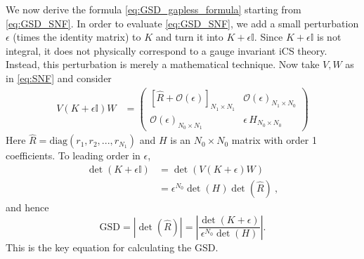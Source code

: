 \documentclass[aps,prb,twocolumn,superscriptaddress,floatfix,10pt,nofootinbib]{revtex4-2}
\theoremstyle{definition}
\begin{document}
We now derive the formula \eqref{eq:GSD_gapless_formula} starting from \eqref{eq:GSD_SNF}. In order to evaluate \eqref{eq:GSD_SNF}, we add a small perturbation $\epsilon$ (times the identity matrix) to $K$ and turn it into $K+\epsilon\mathbb{I}$. Since $K+\epsilon\mathbb{I}$ is not integral, it does not physically correspond to a gauge invariant iCS theory. Instead, this perturbation is merely a mathematical technique. Now take $V,W$ as in \eqref{eq:SNF} and consider
\begin{align}
    V(K+\epsilon\mathbb{I})W&=
\begin{pmatrix}
    \left[\hat R+\mathcal{O}(\epsilon)\right]_{N_1\times N_1} & \mathcal{O}(\epsilon)_{N_1\times N_0}\\
    \mathcal{O}(\epsilon)_{N_0\times N_1} & \epsilon\, H_{N_0\times N_0}
\end{pmatrix} \label{eq:CS_gapless_block} \nonumber
\end{align}
Here $\hat R=\text{diag}(r_1,r_2,...,r_{N_1})$ and $H$ is an $N_0\times N_0$ matrix with order 1 coefficients.
To leading order in $\epsilon$,
\begin{align*}
    \det(K+\epsilon\mathbb{I})&=\det(V(K+\epsilon)W)\\
    &=\epsilon^{N_0}\det(H)\det(\hat{R})~,
\end{align*}
and hence
\begin{equation}\label{eq:GSD_gapless_key}
    \text{GSD}=|\det(\hat{R})|=\left|\frac{\det(K+\epsilon)}{\epsilon^{N_0}\det(H)}\right|.
\end{equation}
This is the key equation for calculating the GSD. 
\end{document}
